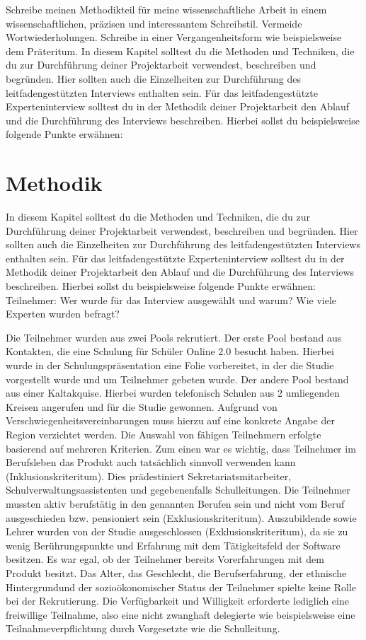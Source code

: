 Schreibe meinen Methodikteil für meine wissenschaftliche Arbeit in einem wissenschaftlichen, präzisen und interessantem Schreibstil. Vermeide Wortwiederholungen. Schreibe in einer Vergangenheitsform wie beispielsweise dem Präteritum.
In diesem Kapitel solltest du die Methoden und Techniken, die du zur Durchführung deiner Projektarbeit verwendest, beschreiben und begründen. Hier sollten auch die Einzelheiten zur Durchführung des leitfadengestützten Interviews enthalten sein.
Für das leitfadengestützte Experteninterview solltest du in der Methodik deiner Projektarbeit den Ablauf und die Durchführung des Interviews beschreiben. Hierbei sollst du beispielsweise folgende Punkte erwähnen:


\section{Methodik}
In diesem Kapitel solltest du die Methoden und Techniken, die du zur Durchführung deiner Projektarbeit verwendest, beschreiben und begründen. Hier sollten auch die Einzelheiten zur Durchführung des leitfadengestützten Interviews enthalten sein.
Für das leitfadengestützte Experteninterview solltest du in der Methodik deiner Projektarbeit den Ablauf und die Durchführung des Interviews beschreiben. Hierbei sollst du beispielsweise folgende Punkte erwähnen:
Teilnehmer: Wer wurde für das Interview ausgewählt und warum? Wie viele Experten wurden befragt? 

Die Teilnehmer wurden aus zwei Pools rekrutiert. Der erste Pool bestand aus Kontakten, die eine Schulung für Schüler Online 2.0 besucht haben. Hierbei wurde in der Schulungspräsentation eine Folie vorbereitet, in der die Studie vorgestellt wurde und um Teilnehmer gebeten wurde. Der andere Pool bestand aus einer Kaltakquise. Hierbei wurden telefonisch Schulen aus 2 umliegenden Kreisen angerufen und für die Studie gewonnen. Aufgrund von Verschwiegenheitsvereinbarungen muss hierzu auf eine konkrete Angabe der Region verzichtet werden.
Die Auswahl von fähigen Teilnehmern erfolgte basierend auf mehreren Kriterien. Zum einen war es wichtig, dass Teilnehmer im Berufsleben das Produkt auch tatsächlich sinnvoll verwenden kann (Inklusionskriteritum). Dies prädestiniert Sekretariatsmitarbeiter, Schulverwaltungsassistenten und gegebenenfalls Schulleitungen. Die Teilnehmer mussten aktiv berufstätig in den genannten Berufen sein und nicht vom Beruf ausgeschieden bzw. pensioniert sein (Exklusionskriteritum). Auszubildende sowie Lehrer wurden von der Studie ausgeschlossen (Exklusionskriteritum), da sie zu wenig Berührungspunkte und Erfahrung mit dem Tätigkeitsfeld der Software besitzen. Es war egal, ob der Teilnehmer bereits Vorerfahrungen mit dem Produkt besitzt. Das Alter, das Geschlecht, die Berufserfahrung, der ethnische Hintergrundund der sozioökonomischer Status der Teilnehmer spielte keine Rolle bei der Rekrutierung. 
Die Verfügbarkeit und Willigkeit erforderte lediglich eine freiwillige Teilnahme, also eine nicht zwanghaft delegierte wie beispielsweise eine Teilnahmeverpflichtung durch Vorgesetzte wie die Schulleitung.

